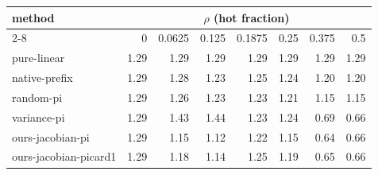 \begin{tabular}{lrrrrrrr}
\toprule
method & \multicolumn{7}{c}{$\rho$ (hot fraction)} \\
\cmidrule(lr){2-8}
 & 0 & 0.0625 & 0.125 & 0.1875 & 0.25 & 0.375 & 0.5 \\
\midrule
pure-linear & 1.29 & 1.29 & 1.29 & 1.29 & 1.29 & 1.29 & 1.29 \\
native-prefix & 1.29 & 1.28 & 1.23 & 1.25 & 1.24 & 1.20 & 1.20 \\
random-pi & 1.29 & 1.26 & 1.23 & 1.23 & 1.21 & 1.15 & 1.15 \\
variance-pi & 1.29 & 1.43 & 1.44 & 1.23 & 1.24 & 0.69 & 0.66 \\
ours-jacobian-pi & 1.29 & 1.15 & 1.12 & 1.22 & 1.15 & 0.64 & 0.66 \\
ours-jacobian-picard1 & 1.29 & 1.18 & 1.14 & 1.25 & 1.19 & 0.65 & 0.66 \\
\bottomrule
\end{tabular}
